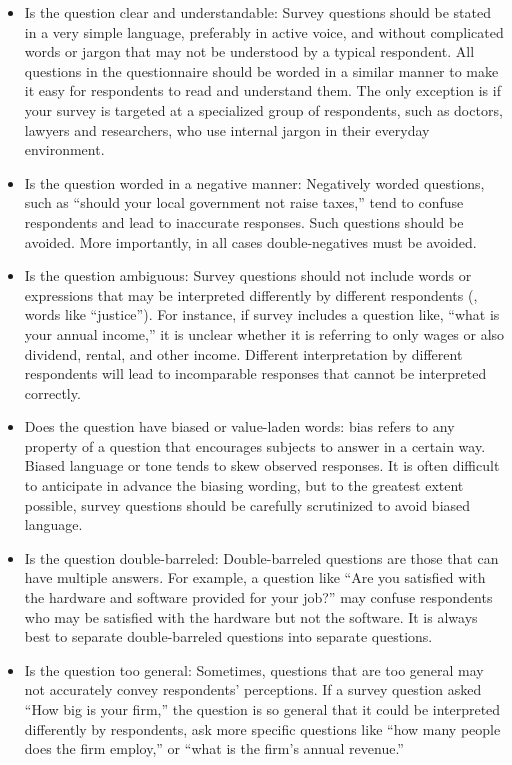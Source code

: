 \begin{itemize}
	\item Is the question clear and understandable: Survey questions should be stated in a very simple language, preferably in active voice, and without complicated words or jargon that may not be understood by a typical respondent. All questions in the questionnaire should be worded in a similar manner to make it easy for respondents to read and understand them. The only exception is if your survey is targeted at a specialized group of respondents, such as doctors, lawyers and researchers, who use internal jargon in their everyday environment.

	\item Is the question worded in a negative manner: Negatively worded questions, such as ``should your local government not raise taxes,'' tend to confuse respondents and lead to inaccurate responses. Such questions should be avoided. More importantly, in all cases double-negatives must be avoided.

	\item Is the question ambiguous: Survey questions should not include words or expressions that may be interpreted differently by different respondents (\eg, words like ``justice''). For instance, if survey includes a question like, ``what is your annual income,'' it is unclear whether it is referring to only wages or also dividend, rental, and other income. Different interpretation by different respondents will lead to incomparable responses that cannot be interpreted correctly.

	\item Does the question have biased or value-laden words: \gls{bias} refers to any property of a question that encourages subjects to answer in a certain way. Biased language or tone tends to skew observed responses. It is often difficult to anticipate in advance the biasing wording, but to the greatest extent possible, survey questions should be carefully scrutinized to avoid biased language.

	\item Is the question double-barreled: Double-barreled questions are those that can have multiple answers. For example, a question like ``Are you satisfied with the hardware and software provided for your job?'' may confuse respondents who may be satisfied with the hardware but not the software. It is always best to separate double-barreled questions into separate questions.

	\item Is the question too general: Sometimes, questions that are too general may not accurately convey respondents' perceptions. If a survey question asked ``How big is your firm,'' the question is so general that it could be interpreted differently by respondents, ask more specific questions like ``how many people does the firm employ,'' or ``what is the firm's annual revenue.''


\end{itemize}
